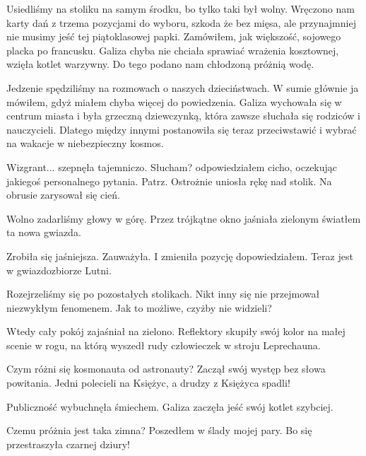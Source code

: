 Usiedliśmy na stoliku na samym środku, bo tylko taki był wolny.
Wręczono nam karty dań z trzema pozycjami do wyboru, szkoda że bez mięsa, ale przynajmniej nie musimy jeść tej piątoklasowej papki.
Zamówiłem, jak większość, sojowego placka po francusku.
Galiza chyba nie chciała sprawiać wrażenia kosztownej, wzięła kotlet warzywny.
Do tego podano nam chłodzoną próżnią wodę.

Jedzenie spędziliśmy na rozmowach o naszych dzieciństwach.
W sumie głównie ja mówiłem, gdyż miałem chyba więcej do powiedzenia.
Galiza wychowała się w centrum miasta i była grzeczną dziewczynką, która zawsze słuchała się rodziców i nauczycieli.
Dlatego między innymi postanowiła się teraz przeciwstawić i wybrać na wakacje w niebezpieczny kosmos.

\begin{dialogue}
	\ds{} Wizgrant... \dm{} szepnęła tajemniczo.
	\ds{} Słucham? \dm{} odpowiedziałem cicho, oczekując jakiegoś personalnego pytania.
	\ds{} Patrz. \dm{} Ostrożnie uniosła rękę nad stolik. Na obrusie zarysował się cień.
\end{dialogue}

Wolno zadarliśmy głowy w górę. Przez trójkątne okno jaśniała zielonym światłem ta nowa gwiazda.

\begin{dialogue}
	\ds{} Zrobiła się jaśniejsza. \dm{} Zauważyła.
	\ds{} I zmieniła pozycję \dm{} dopowiedziałem. \dm{} Teraz jest w gwiazdozbiorze Lutni.
\end{dialogue}

Rozejrzeliśmy się po pozostałych stolikach. Nikt inny się nie przejmował niezwykłym fenomenem.
Jak to możliwe, czyżby nie widzieli?

Wtedy cały pokój zajaśniał na zielono.
Reflektory skupiły swój kolor na małej scenie w rogu, na którą wyszedł rudy człowieczek w stroju Leprechauna.

\begin{dialogue}
	\ds{} Czym różni się kosmonauta od astronauty? \dm{} Zaczął swój występ bez słowa powitania. \dm{} Jedni polecieli na Księżyc, a drudzy z Księżyca spadli!
\end{dialogue}

Publiczność wybuchnęła śmiechem. Galiza zaczęła jeść swój kotlet szybciej.

\begin{dialogue}
	\ds{} Czemu próżnia jest taka zimna? \dm{} Poszedłem w ślady mojej pary. \dm{} Bo się przestraszyła czarnej dziury!
\end{dialogue}

